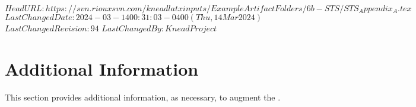 \svnidlong
{$HeadURL: https://svn.riouxsvn.com/kneadlatxinputs/ExampleArtifactFolders/6b-STS/STS_Appendix_A.tex $}
{$LastChangedDate: 2024-03-14 00:31:03 -0400 (Thu, 14 Mar 2024) $}
{$LastChangedRevision: 94 $}
{$LastChangedBy: KneadProject $}

\chapter{Additional Information}
\label{sec:AdditionalInformation}


This section provides additional information, as necessary, to augment the \STS.
